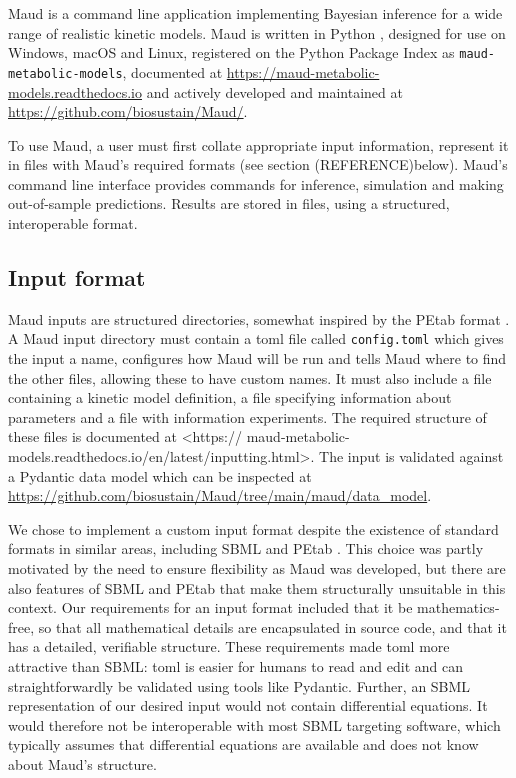\documentclass[journal=asbcd6,manuscript=article,layout=traditional]{achemso}
\begin{document}
Maud is a command line application implementing Bayesian inference for a
wide range of realistic kinetic models. Maud is written in Python
\citep{vanrossumPythonReferenceManual2009}, designed for use on Windows,
macOS and Linux, registered on the Python Package Index as
\texttt{maud-metabolic-models}, documented at
\url{https://maud-metabolic-models.readthedocs.io} and actively
developed and maintained at \url{https://github.com/biosustain/Maud/}.

To use Maud, a user must first collate appropriate input information,
represent it in files with Maud's required formats (see section
(REFERENCE)below). Maud's command line interface provides commands for
inference, simulation and making out-of-sample predictions. Results are
stored in files, using a structured, interoperable format.

\hypertarget{input-format}{%
\subsection{Input format}\label{input-format}}

Maud inputs are structured directories, somewhat inspired by the PEtab
format \citep{SchmiesterSch2021}. A Maud input directory must contain a
toml \citep{preston-wernertomandgedampradyunTOMLSpecification0rc2020}
file called \texttt{config.toml} which gives the input a name,
configures how Maud will be run and tells Maud where to find the other
files, allowing these to have custom names. It must also include a file
containing a kinetic model definition, a file specifying information
about parameters and a file with information experiments. The required
structure of these files is documented at \textless https://
maud-metabolic-models.readthedocs.io/en/latest/inputting.html\textgreater.
The input is validated against a Pydantic
\citep{pydanticdevelopersPydantic2022} data model which can be inspected
at \url{https://github.com/biosustain/Maud/tree/main/maud/data_model}.

We chose to implement a custom input format despite the existence of
standard formats in similar areas, including SBML
\citep{keatingSBMLLevelExtensible2020} and PEtab
\citep{SchmiesterSch2021}. This choice was partly motivated by the need
to ensure flexibility as Maud was developed, but there are also features
of SBML and PEtab that make them structurally unsuitable in this
context. Our requirements for an input format included that it be
mathematics-free, so that all mathematical details are encapsulated in
source code, and that it has a detailed, verifiable structure. These
requirements made toml more attractive than SBML: toml is easier for
humans to read and edit and can straightforwardly be validated using
tools like Pydantic. Further, an SBML representation of our desired
input would not contain differential equations. It would therefore not
be interoperable with most SBML targeting software, which typically
assumes that differential equations are available and does not know
about Maud's structure.
\end{document}
